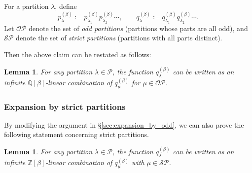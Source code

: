 \documentclass[dvipdfmx]{amsart}
\newtheorem{lemma}[thm]{Lemma}
\theoremstyle{definition}
\theoremstyle{remark}
\begin{document}
For a partition \( \lambda \), define
\[
p_\lambda^{(\beta)} := p_{\lambda_1}^{(\beta)} p_{\lambda_2}^{(\beta)} \cdots, \qquad
q_\lambda^{(\beta)} := q_{\lambda_1}^{(\beta)} q_{\lambda_2}^{(\beta)} \cdots.
\]
Let \( \mathcal{OP} \) denote the set of \emph{odd partitions} (partitions whose parts are all odd), and \( \mathcal{SP} \) denote the set of \emph{strict partitions} (partitions with all parts distinct).

Then the above claim can be restated as follows:

\begin{lemma}\label{eq:expansion_by_odd}
For any partition \( \lambda \in \mathcal{P} \), the function \( q_\lambda^{(\beta)} \) can be written as an infinite \( \mathbb{Q}[\beta] \)-linear combination of \( q_\mu^{(\beta)} \) for \( \mu \in \mathcal{OP} \).
\end{lemma}

\subsubsection{Expansion by strict partitions}

By modifying the argument in \S\ref{sec:expansion_by_odd}, we can also prove the following statement concerning strict partitions.

\begin{lemma}\label{eq:expansion_by_strict}
For any partition \( \lambda \in \mathcal{P} \), the function \( q_\lambda^{(\beta)} \) can be written as an infinite \( \mathbb{Z}[\beta] \)-linear combination of \( q_\mu^{(\beta)} \) with \( \mu \in \mathcal{SP} \).
\end{lemma}
\end{document}

